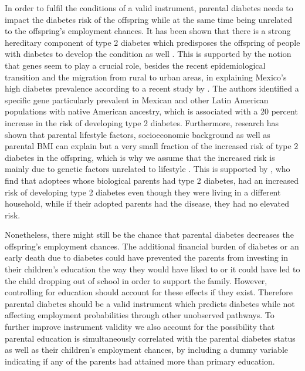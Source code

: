 In order to fulfil the conditions of a valid instrument,
parental diabetes needs to impact the diabetes risk of the offspring
while at the same time being unrelated to the offspring's employment
chances. It has been shown that there is a strong hereditary component
of type 2 diabetes which predisposes the offspring of people with
diabetes to develop the condition as well \parencite{Herder2011,TheInteractConsortium2013}.
This is supported by the notion that genes seem to play a crucial
role, besides the recent epidemiological transition and the migration
from rural to urban areas, in explaining Mexico's high diabetes prevalence
according to a recent study by \textcite{Williams2013}. The authors
identified a specific gene particularly prevalent in Mexican and other
Latin American populations with native American ancestry, which is
associated with a 20 percent increase in the risk of developing type
2 diabetes. Furthermore, research has shown that parental lifestyle
factors, socioeconomic background as well as parental \ac{BMI} can
explain but a very small fraction of the increased risk of type 2
diabetes in the offspring, which is why we assume that the increased
risk is mainly due to genetic factors unrelated to lifestyle \parencite{Herder2011,TheInteractConsortium2013}.
This is supported by \textcite{Hemminki2010}, who find that adoptees
whose biological parents had type 2 diabetes, had an increased risk
of developing type 2 diabetes even though they were living in a different
household, while if their adopted parents had the disease, they had
no elevated risk. 

Nonetheless, there might still be the chance that parental
diabetes decreases the offspring's employment chances. The additional
financial burden of diabetes or an early death due to diabetes could
have prevented the parents from investing in their children's education
the way they would have liked to or it could have led to the child
dropping out of school in order to support the family. However, controlling
for education should account for these effects if they exist. Therefore
parental diabetes should be a valid instrument which predicts diabetes
while not affecting employment probabilities through other unobserved
pathways. To further improve instrument validity we also account for
the possibility that parental education is simultaneously correlated
with the parental diabetes status as well as their children's employment
chances, by including a dummy variable indicating if any of the parents
had attained more than primary education. 

